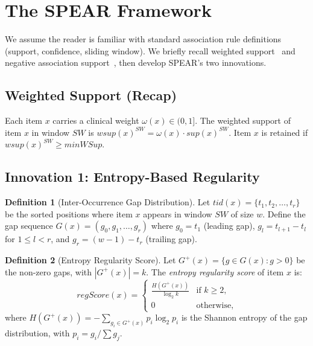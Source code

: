 \documentclass[10pt,twocolumn]{article}
\theoremstyle{plain}
\theoremstyle{definition}
\newtheorem{definition}{Definition}[section]
\theoremstyle{remark}
\newcommand{\wsup}{\mathit{wsup}}
\newcommand{\regscore}{\mathit{regScore}}
\newcommand{\SW}{\mathit{SW}}
\begin{document}
\section{The SPEAR Framework}
\label{sec:method}

We assume the reader is familiar with standard association rule
definitions (support, confidence, sliding window).
We briefly recall weighted support~\cite{ouyang2015} and negative
association support~\cite{sastry2025}, then develop SPEAR's two
innovations.

\subsection{Weighted Support (Recap)}

Each item $x$ carries a clinical weight $\omega(x) \in (0,1]$.
The weighted support of item $x$ in window $\SW$ is
$\wsup(x)^{\SW} = \omega(x) \cdot \mathit{sup}(x)^{\SW}$.
Item $x$ is retained if $\wsup(x)^{\SW} \geq \mathit{minWSup}$.

\subsection{Innovation 1: Entropy-Based Regularity}
\label{subsec:entropy}

\begin{definition}[Inter-Occurrence Gap Distribution]
\label{def:gap_dist}
Let $\mathit{tid}(x) = \{t_1, t_2, \ldots, t_r\}$ be the sorted
positions where item $x$ appears in window $\SW$ of size $w$.
Define the gap sequence $G(x) = (g_0, g_1, \ldots, g_r)$ where
$g_0 = t_1$ (leading gap), $g_l = t_{l+1} - t_l$ for
$1 \leq l < r$, and $g_r = (w-1) - t_r$ (trailing gap).
\end{definition}

\begin{definition}[Entropy Regularity Score]
\label{def:entropy_reg}
Let $G^+(x) = \{g \in G(x) : g > 0\}$ be the non-zero gaps, with
$|G^+(x)| = k$.
The \emph{entropy regularity score} of item $x$ is:
\begin{equation}
  \regscore(x) =
  \begin{cases}
    \displaystyle \frac{H(G^+(x))}{\log_2 k}
      & \text{if } k \geq 2, \\[6pt]
    0 & \text{otherwise,}
  \end{cases}
  \label{eq:regscore}
\end{equation}
where $H(G^+(x)) = -\sum_{g_i \in G^+(x)} p_i \log_2 p_i$ is the
Shannon entropy of the gap distribution, with
$p_i = g_i / \sum g_j$.
\end{definition}
\end{document}
